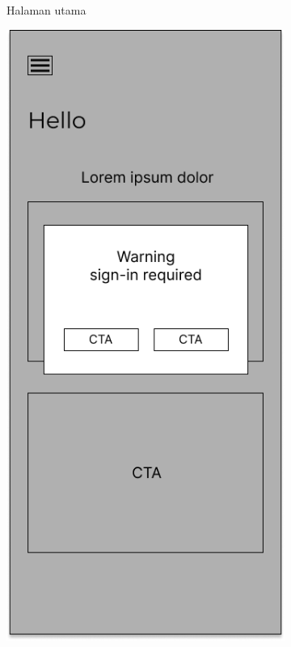 \begin{figure}[H]
\begin{subfigure}[b]{0.3\textwidth}
	  \caption{Halaman utama}
	  \label{fig:ActivityMain2}
	\end{subfigure}
	\begin{subfigure}[b]{0.3\textwidth}
		\centering
	  \includegraphics[width=\linewidth]{contents/chapter-3/images/MF-home-2.png}

\end{subfigure}
\end{figure}
